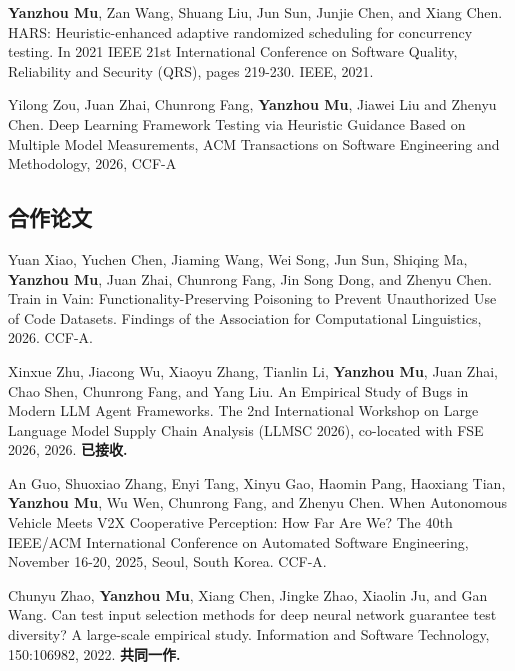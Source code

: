 \documentclass[a4paper,11pt]{article}
\begin{document}
    \vspace{2mm}
    \item {\textbf{Yanzhou Mu}, Zan Wang, Shuang Liu, Jun Sun, Junjie Chen, and Xiang Chen. HARS: Heuristic-enhanced adaptive randomized scheduling for concurrency testing. In 2021 IEEE 21st International Conference on Software Quality, Reliability and Security (QRS), pages 219-230. IEEE, 2021.}

    \vspace{2mm}
    \item {Yilong Zou, Juan Zhai, Chunrong Fang, \textbf{Yanzhou Mu}, Jiawei Liu and Zhenyu Chen. Deep Learning Framework Testing via Heuristic Guidance Based on Multiple Model Measurements, ACM Transactions on Software Engineering and Methodology, 2026, CCF-A}

    \vspace{2mm}
    \subsection{\textbf{合作论文}}
    \item {Yuan Xiao, Yuchen Chen, Jiaming Wang, Wei Song, Jun Sun, Shiqing Ma, \textbf{Yanzhou Mu}, Juan Zhai, Chunrong Fang, Jin Song Dong, and Zhenyu Chen. Train in Vain: Functionality-Preserving Poisoning to Prevent Unauthorized Use of Code Datasets. Findings of the Association for Computational Linguistics, 2026. CCF-A.}

    \vspace{2mm}
    \item {Xinxue Zhu, Jiacong Wu, Xiaoyu Zhang, Tianlin Li, \textbf{Yanzhou Mu}, Juan Zhai, Chao Shen, Chunrong Fang, and Yang Liu. An Empirical Study of Bugs in Modern LLM Agent Frameworks. The 2nd International Workshop on Large Language Model Supply Chain Analysis (LLMSC 2026), co-located with FSE 2026, 2026. \textbf{已接收.}}
    
    \vspace{2mm}
    \item {An Guo, Shuoxiao Zhang, Enyi Tang, Xinyu Gao, Haomin Pang, Haoxiang Tian, \textbf{Yanzhou Mu}, Wu Wen, Chunrong Fang, and Zhenyu Chen. When Autonomous Vehicle Meets V2X Cooperative Perception: How Far Are We? The 40th IEEE/ACM International Conference on Automated Software Engineering, November 16-20, 2025, Seoul, South Korea. CCF-A.}

    \vspace{2mm}
    \item {Chunyu Zhao, \textbf{Yanzhou Mu}, Xiang Chen, Jingke Zhao, Xiaolin Ju, and Gan Wang. Can test input selection methods for deep neural network guarantee test diversity? A large-scale empirical study. Information and Software Technology, 150:106982, 2022. \textbf{共同一作.}}
\end{document}
